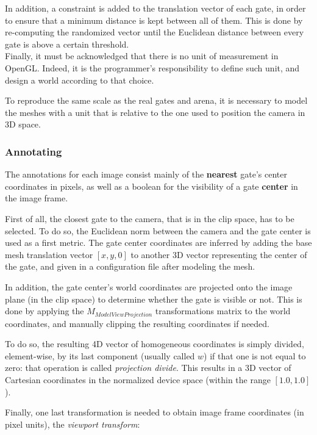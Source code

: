 In addition, a constraint is added to the translation vector of each gate, in
order to ensure that a minimum distance is kept between all of them. This is
done by re-computing the randomized vector until the Euclidean distance between
every gate is above a certain threshold.\\

Finally, it must be acknowledged that there is no unit of measurement in
OpenGL. Indeed, it is the programmer's responsibility to define such unit, and
design a world according to that choice.

To reproduce the same scale as the real gates and arena, it is necessary to
model the meshes with a unit that is relative to the one used to position the
camera in 3D space.

	\subsubsection{Annotating}

The annotations for each image consist mainly of the \textbf{nearest}
gate's center coordinates in pixels, as well as a boolean for the
visibility of a gate \textbf{center} in the image frame.

First of all, the closest gate to the camera, that is in the clip space, has to
be selected. To do so, the Euclidean norm between the camera and the gate
center is used as a first metric. The gate center coordinates are inferred by
adding the base mesh translation vector $[x, y, 0]$ to another 3D vector
representing the center of the gate, and given in a configuration file after
modeling the mesh.

In addition, the gate center's world coordinates are projected onto the image
plane (in the clip space) to determine whether the gate is visible or not. This
is done by applying the $M_{ModelViewProjection}$ transformations matrix to the
world coordinates, and manually clipping the resulting coordinates if needed.

To do so, the resulting 4D vector of homogeneous coordinates is simply divided,
element-wise, by its last component (usually called $w$) if that one is not
equal to zero: that operation is called \emph{projection divide}. This results
in a 3D vector of Cartesian coordinates in the normalized device space (within
the range $[1.0, 1.0]$).

Finally, one last transformation is needed to obtain image frame coordinates (in
pixel units), the \emph{viewport transform}:


